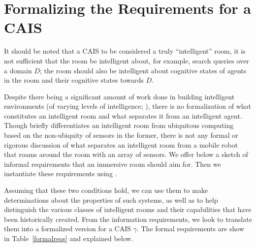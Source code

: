 \section{Formalizing the Requirements for a CAIS}

It should be noted that a CAIS to be considered a truly ``intelligent''
room, it is not sufficient that the room be intelligent about, for
example, search queries over a domain $D$; the room should also be
intelligent about cognitive states of agents in the room and their
cognitive states towards $D$.

Despite there being a significant amount of work done in building
intelligent environments (of varying levels of intelligence;
\cite{coen_design_1998, brooks_intelligent_1997,chan_review_2008}), there
is no formalization of what constitutes an intelligent room and what
separates it from an intelligent agent.  Though \cite{coen_design_1998}
briefly differentiates an intelligent room from ubiquitous computing
based on the non-ubiquity of sensors in the former, there is not any
formal or rigorous discussion of what separates an intelligent room
from a mobile robot that roams around the room with an array of
sensors.  We offer below a sketch of informal requirements that an
immersive room should aim for.  Then we instantiate these requirements
using \CEC.

Assuming that these two conditions hold, we can use them to make determinations
about the properties of such systems, as well as to help distinguish the various
classes of intelligent rooms and their capabilities that have been historically created.
From the information requirements, we look to translate them into a formalized version
for a CAIS $\gamma$.  The formal requirements are show in Table~\ref{formalreqs} and
explained below.

